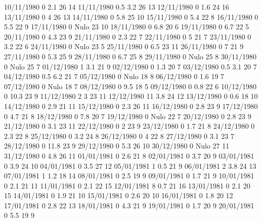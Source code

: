 10/11/1980  0      2.1    26     14 
11/11/1980  0.5    3.2    26     13 
12/11/1980  0      1.6    24     16 
13/11/1980  0      4      26     13 
14/11/1980  0      5.8    25     10 
15/11/1980  0      5.4    22     8 
16/11/1980  0      5.5    22     9 
17/11/1980  0     Nulo    23     10 
18/11/1980  0      6.8    20     6 
19/11/1980  0      6.7    22     5 
20/11/1980  0      4.3    23     9 
21/11/1980  0      2.3    22     7 
22/11/1980  0      5      21     7 
23/11/1980  0      3.2    22     6 
24/11/1980  0     Nulo    23     5 
25/11/1980  0      6.5    23     11 
26/11/1980  0      7      21     9 
27/11/1980  0      5.3    25     9 
28/11/1980  0      6.7    25     8 
29/11/1980  0     Nulo    25     8 
30/11/1980  0     Nulo    25     7 
01/12/1980  1      3.1    21     9 
02/12/1980  0      1.3    20     7 
03/12/1980  0.5    3.1    20     7 
04/12/1980  0.5    6.2    21     7 
05/12/1980  0     Nulo    18     8 
06/12/1980  0      1.6    19     7 
07/12/1980  0     Nulo    18     7 
08/12/1980  0      9.5    18     5 
09/12/1980  0      0.8    22     6 
10/12/1980  0      10.3   23     9 
11/12/1980  2      3      23     11 
12/12/1980  11     3.8    24     12 
13/12/1980  0      0.6    18     10 
14/12/1980  0      2.9    21     11 
15/12/1980  0      2.3    26     11 
16/12/1980  0      2.8    23     9 
17/12/1980  0      4.7    21     8 
18/12/1980  0      7.8    20     7 
19/12/1980  0     Nulo    22     7 
20/12/1980  0      2.8    23     9 
21/12/1980  0      3.1    23     11 
22/12/1980  0      2      23     9 
23/12/1980  0      1.7    21     8 
24/12/1980  0      2.3    22     8 
25/12/1980  0      3.2    24     8 
26/12/1980  0      4      22     8 
27/12/1980  0      3.1    23     7 
28/12/1980  0      11.8   23     9 
29/12/1980  0      5.3    26     10 
30/12/1980  0     Nulo    27     11 
31/12/1980  0      4.8    26     11 
01/01/1981  0      2.6    21     8 
02/01/1981  0      3.7    20     9 
03/01/1981  0      3.9    24     10 
04/01/1981  0      3.5    27     12 
05/01/1981  1      0.5    21     9 
06/01/1981  2      3.8    24     13 
07/01/1981  1      1.2    18     14 
08/01/1981  0      2.5    19     9 
09/01/1981  0      1.7    21     9 
10/01/1981  0      2.1    21     11 
11/01/1981  0      2.1    22     15 
12/01/1981  8      0.7    21     16 
13/01/1981  0      2.1    20     15 
14/01/1981  0      1.9    21     10 
15/01/1981  0      2.6    20     10 
16/01/1981  0      1.8    20     12 
17/01/1981  0      2.8    22     13 
18/01/1981  0      4.3    21     9 
19/01/1981  0      1.7    20     9 
20/01/1981  0      5.5    19     9 

